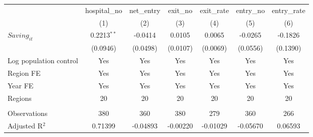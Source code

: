 \begingroup
\centering
\begin{tabular}{lcccccc}
   \toprule
                          & hospital\_no  & net\_entry  & exit\_no  & exit\_rate  & entry\_no  & entry\_rate \\    
                          & (1)           & (2)         & (3)       & (4)         & (5)        & (6)\\  
   \midrule 
   $Saving_{it}$          & 0.2213$^{**}$ & -0.0414     & 0.0105    & 0.0065      & -0.0265    & -0.1826\\   
                          & (0.0946)      & (0.0498)    & (0.0107)  & (0.0069)    & (0.0556)   & (0.1390)\\   
   Log population control & Yes           & Yes         & Yes       & Yes         & Yes        & Yes\\  
   Region FE              & Yes           & Yes         & Yes       & Yes         & Yes        & Yes\\  
   Year FE                & Yes           & Yes         & Yes       & Yes         & Yes        & Yes\\  
   Regions                & 20            & 20          & 20        & 20          & 20         & 20\\  
    \\
   Observations           & 380           & 360         & 380       & 279         & 360        & 266\\  
   Adjusted R$^2$         & 0.71399       & -0.04893    & -0.00220  & -0.01029    & -0.05670   & 0.06593\\  
   \bottomrule
\end{tabular}
\par\endgroup
